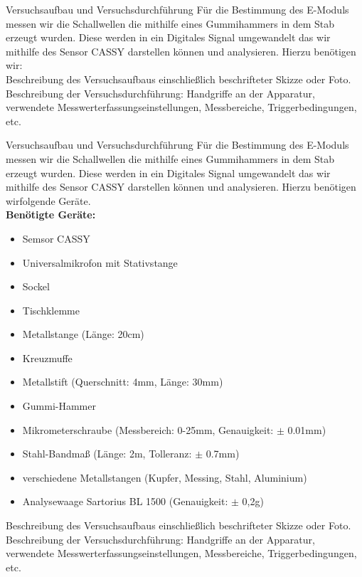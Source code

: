 \documentclass[twoside]{protokoll}
\begin{document}
\begin{aufgabe}{Versuchsaufbau und Versuchsdurchführung}
  Für die Bestimmung des E-Moduls messen wir die Schallwellen die mithilfe eines Gummihammers in dem Stab erzeugt wurden. Diese werden in ein Digitales Signal umgewandelt das wir mithilfe des Sensor CASSY darstellen können und analysieren. Hierzu benötigen wir:\\

  Beschreibung des Versuchsaufbaus einschließlich beschrifteter Skizze
  oder Foto. Beschreibung der Versuchsdurchführung: Handgriffe an der
  Apparatur, verwendete Messwerterfassungseinstellungen, Messbereiche,
  Triggerbedingungen, etc.
\end{aufgabe}



\begin{aufgabe}{Versuchsaufbau und Versuchsdurchführung}
  Für die Bestimmung des E-Moduls messen wir die Schallwellen die mithilfe eines Gummihammers in dem Stab erzeugt wurden. Diese werden in ein Digitales Signal umgewandelt das wir mithilfe des Sensor CASSY darstellen können und analysieren. Hierzu benötigen wirfolgende Geräte.\\

\textbf{Benötigte Geräte:}
\begin{itemize}
\item Semsor CASSY
\item Universalmikrofon mit Stativstange
\item Sockel
\item Tischklemme
\item Metallstange (Länge: 20cm)
\item Kreuzmuffe
\item Metallstift (Querschnitt: 4mm, Länge: 30mm)
\item Gummi-Hammer
\item Mikrometerschraube (Messbereich: 0-25mm, Genauigkeit: $\pm$ 0.01mm)
\item Stahl-Bandmaß (Länge: 2m, Tolleranz: $\pm$ 0.7mm)
\item verschiedene Metallstangen (Kupfer, Messing, Stahl, Aluminium)
\item Analysewaage Sartorius BL 1500 (Genauigkeit: $\pm$ 0,2g)
\end{itemize}
  
  
  Beschreibung des Versuchsaufbaus einschließlich beschrifteter Skizze
  oder Foto. Beschreibung der Versuchsdurchführung: Handgriffe an der
  Apparatur, verwendete Messwerterfassungseinstellungen, Messbereiche,
  Triggerbedingungen, etc.
\end{aufgabe}
\end{document}
